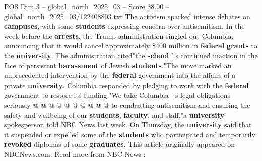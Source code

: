 \begin{textsample}{POS Dim 3 – global\_north\_2025\_03 – Score 38.00 – global\_north\_2025\_03/122408803.txt}
The activism sparked intense debates on \textbf{campuses}, with some \textbf{students} expressing concern over antisemitism.
In the week before the \textbf{arrests}, the Trump administration singled out Columbia, announcing that it would cancel approximately \$400 million in \textbf{federal} \textbf{grants} to the \textbf{university}.
The administration cited"the \textbf{school} ' s continued inaction in the face of persistent \textbf{harassment} of Jewish \textbf{students}."The move marked an unprecedented intervention by the \textbf{federal} government into the affairs of a private \textbf{university}.
Columbia responded by pledging to work with the \textbf{federal} government to restore its funding."We take Columbia ' s legal obligations seriously @ @ @ @ @ @ @ @ @ @ to combatting antisemitism and ensuring the safety and wellbeing of our \textbf{students}, \textbf{faculty}, and staff,"a \textbf{university} spokesperson told NBC News last week.
On Thursday, the \textbf{university} said that it suspended or expelled some of the \textbf{students} who participated and temporarily \textbf{revoked} diplomas of some \textbf{graduates}.
This article originally appeared on NBCNews.com.
Read more from NBC News :

\end{textsample}
